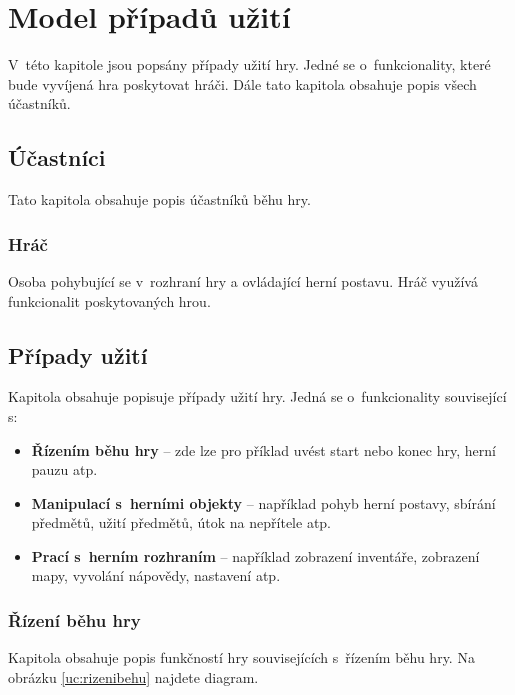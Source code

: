 \documentclass[12pt,a4paper]{article}
\begin{document}
\newpage

\section{Model případů užití}
V~této kapitole jsou popsány případy užití hry. Jedné se o~funkcionality, které
bude vyvíjená hra poskytovat hráči. Dále tato kapitola obsahuje popis všech
účastníků.

\subsection{Účastníci}
Tato kapitola obsahuje popis účastníků běhu hry.

\subsubsection{Hráč}
Osoba pohybující se v~rozhraní hry a ovládající herní postavu. Hráč využívá
funkcionalit poskytovaných hrou.


\subsection{Případy užití}
Kapitola obsahuje popisuje případy užití hry. Jedná se o~funkcionality související s:

\begin{itemize}
  \item{\textbf{Řízením běhu hry} -- zde lze pro příklad uvést start nebo konec hry, herní
    pauzu atp.}
  \item{\textbf{Manipulací s~herními objekty} -- například pohyb herní postavy, sbírání
    předmětů, užití předmětů, útok na nepřítele atp.}
  \item{\textbf{Prací s~herním rozhraním} -- například zobrazení inventáře,
    zobrazení mapy, vyvolání nápovědy, nastavení atp.}
\end{itemize}

\subsubsection{Řízení běhu hry}

Kapitola obsahuje popis funkčností hry souvisejících s~řízením běhu hry.
Na obrázku \ref{uc:rizenibehu} najdete diagram.
\end{document}
